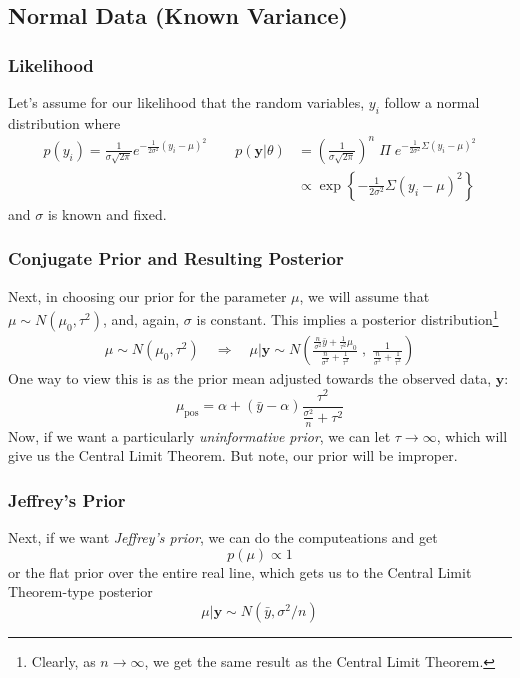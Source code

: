 \documentclass[12pt]{article}
\begin{document}
\newpage

\subsection{Normal Data (Known Variance)}

\subsubsection{Likelihood}
Let's assume for our likelihood that the random variables, $y_i$
follow a normal distribution where
\begin{align*}
    p(y_i) = \frac{1}{\sigma \sqrt{2\pi}} e^{-\frac{1}{2\sigma^2}
    (y_i - \mu)^2} \qquad p(\mathbf{y} | \theta) &= \left(\frac{1}{  
       \sigma \sqrt{2\pi}}\right)^n \; \Pi \; e^{-\frac{1}{2\sigma^2}
       \Sigma (y_i - \mu)^2}
   \\
   &\propto \exp\left\{ -\frac{1}{2\sigma^2}
      \Sigma (y_i - \mu)^2 \right\}
\end{align*}
and $\sigma$ is known and fixed.  


\subsubsection{Conjugate Prior and Resulting Posterior}
Next, in choosing our prior for the parameter $\mu$, we will assume
that $\mu \sim N(\mu_0, \tau^2)$, and, again, $\sigma$ is constant. 
This implies a posterior distribution\footnote{
Clearly, as $n\rightarrow \infty$, we get the same result as the Central
Limit Theorem.}
\begin{align*}
   \mu \sim N(\mu_0, \tau^2) \quad \Rightarrow \quad
   \mu | \mathbf{y} \sim N\left( \frac{\frac{n}{\sigma^2} \bar{y}
   + \frac{1}{\tau^2} \mu_0}{\frac{n}{\sigma^2} + \frac{1}{\tau^2}}
   \; , \; \frac{1}{\frac{n}{\sigma^2} + \frac{1}{\tau^2}} \right)
\end{align*}
One way to view this is as the prior mean adjusted towards
the observed data, $\mathbf{y}$:
\[ \mu_{\text{pos}} = \alpha + (\bar{y} - \alpha) 
   \frac{\tau^2}{\frac{\sigma^2}{n} + \tau^2} \]
Now, if we want a particularly \emph{uninformative prior}, we can 
let $\tau \rightarrow \infty$, which will give us the Central Limit
Theorem. But note, our prior will be improper.

\subsubsection{Jeffrey's Prior}
Next, if we want \emph{Jeffrey's prior}, 
we can do the computeations and get
   \[ p(\mu) \propto 1 \]
or the flat prior over the entire real line, which gets us to the
Central Limit Theorem-type posterior
   \[ \mu | \mathbf{y} \sim N(\bar{y}, \sigma^2/n) \]
\end{document}
